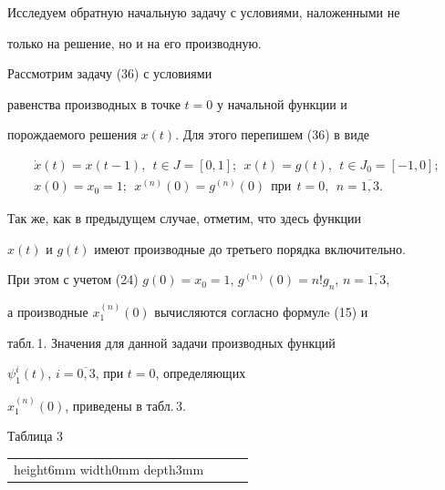 Исследуем обратную начальную задачу с условиями, наложенными не 


только на решение, но и на его производную.





\begin{exam}


Рассмотрим задачу (36) с условиями


равенства производных в точке $t=0$ у начальной функции и


порождаемого решения $x(t)$. Для этого перепишем (36) в виде


\begin{gather}


\Dot{x}(t)=x(t-1), \ \ t\in J=[0,1];\ \ 


x(t)=g(t),\ \ t\in J_0=[-1,0];\\


%


x(0)=x_0=1;\ \ x^{(n)}(0)=g^{(n)}(0)\ \ \text{при}\ \ t=0,\ \


n=\overline{1,3}.


\end{gather}


Так же, как в предыдущем случае, отметим, что здесь функции


$x(t)$ и $g(t)$ имеют производные до третьего порядка включительно.


При этом с учетом (24) $g(0)=


x_0=1$, $g^{(n)}(0)=n!g_n$, $n=\overline{1,3}$,


а производные $x_1^{(n)}(0)$ вычисляются согласно формулe (15) и


табл.\,1. Значения для данной задачи производных функций


$\psi_1^i(t)$, $i=\overline{0,3}$, при $t=0$, определяющих


$x_1^{(n)}(0)$, приведены в табл.\,3.


\medskip





\begin{center}


\hspace{43mm}Таблица 3


\medskip





\begin{tabular}{|c|c|c|c|}


\hline \vrule height6mm width0mm depth3mm



\end{tabular}
\end{center}
\end{exam}
